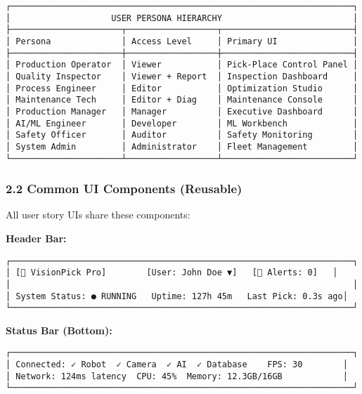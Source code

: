 \documentclass[
]{article}
\begin{document}
\begin{verbatim}
┌────────────────────────────────────────────────────────────────────┐
│                    USER PERSONA HIERARCHY                          │
├──────────────────────┬──────────────────┬──────────────────────────┤
│ Persona              │ Access Level     │ Primary UI               │
├──────────────────────┼──────────────────┼──────────────────────────┤
│ Production Operator  │ Viewer           │ Pick-Place Control Panel │
│ Quality Inspector    │ Viewer + Report  │ Inspection Dashboard     │
│ Process Engineer     │ Editor           │ Optimization Studio      │
│ Maintenance Tech     │ Editor + Diag    │ Maintenance Console      │
│ Production Manager   │ Manager          │ Executive Dashboard      │
│ AI/ML Engineer       │ Developer        │ ML Workbench             │
│ Safety Officer       │ Auditor          │ Safety Monitoring        │
│ System Admin         │ Administrator    │ Fleet Management         │
└──────────────────────┴──────────────────┴──────────────────────────┘
\end{verbatim}

\hypertarget{common-ui-components-reusable}{%
\subsubsection{2.2 Common UI Components
(Reusable)}\label{common-ui-components-reusable}}

All user story UIs share these components:

\textbf{Header Bar:}

\begin{verbatim}
┌────────────────────────────────────────────────────────────────────┐
│ [🤖 VisionPick Pro]        [User: John Doe ▼]   [🔔 Alerts: 0]   │
│                                                                    │
│ System Status: ● RUNNING   Uptime: 127h 45m   Last Pick: 0.3s ago│
└────────────────────────────────────────────────────────────────────┘
\end{verbatim}

\textbf{Status Bar (Bottom):}

\begin{verbatim}
┌────────────────────────────────────────────────────────────────────┐
│ Connected: ✓ Robot  ✓ Camera  ✓ AI  ✓ Database    FPS: 30        │
│ Network: 124ms latency  CPU: 45%  Memory: 12.3GB/16GB            │
└────────────────────────────────────────────────────────────────────┘
\end{verbatim}
\end{document}
